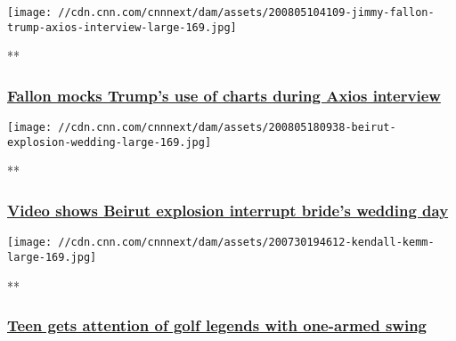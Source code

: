 \href{/videos/media/2020/08/05/late-night-laughs-trump-axios-int-orig-vstan-bdk.cnn/video/playlists/trending-video/}{}

\texttt{[image: //cdn.cnn.com/cnnnext/dam/assets/200805104109-jimmy-fallon-trump-axios-interview-large-169.jpg]}

**

\hypertarget{fallon-mocks-trumps-use-of-charts-during-axios-interview}{%
\subsubsection{\texorpdfstring{\href{/videos/media/2020/08/05/late-night-laughs-trump-axios-int-orig-vstan-bdk.cnn/video/playlists/trending-video/}{Fallon
mocks Trump's use of charts during Axios
interview}}{Fallon mocks Trump's use of charts during Axios interview}}\label{fallon-mocks-trumps-use-of-charts-during-axios-interview}}

\href{/videos/world/2020/08/05/beirut-explosion-wedding-video-zw-orig.cnn/video/playlists/trending-video/}{}

\texttt{[image: //cdn.cnn.com/cnnnext/dam/assets/200805180938-beirut-explosion-wedding-large-169.jpg]}

**

\hypertarget{video-shows-beirut-explosion-interrupt-brides-wedding-day}{%
\subsubsection{\texorpdfstring{\href{/videos/world/2020/08/05/beirut-explosion-wedding-video-zw-orig.cnn/video/playlists/trending-video/}{Video
shows Beirut explosion interrupt bride's wedding
day}}{Video shows Beirut explosion interrupt bride's wedding day}}\label{video-shows-beirut-explosion-interrupt-brides-wedding-day}}

\href{/videos/us/2020/07/30/golfer-kendall-kemm-gets-lesson-from-nick-faldo-after-video-of-one-arm-swing-orig-llr.cnn/video/playlists/trending-video/}{}

\texttt{[image: //cdn.cnn.com/cnnnext/dam/assets/200730194612-kendall-kemm-large-169.jpg]}

**

\hypertarget{teen-gets-attention-of-golf-legends-with-one-armed-swing}{%
\subsubsection{\texorpdfstring{\href{/videos/us/2020/07/30/golfer-kendall-kemm-gets-lesson-from-nick-faldo-after-video-of-one-arm-swing-orig-llr.cnn/video/playlists/trending-video/}{Teen
gets attention of golf legends with one-armed
swing}}{Teen gets attention of golf legends with one-armed swing}}\label{teen-gets-attention-of-golf-legends-with-one-armed-swing}}

